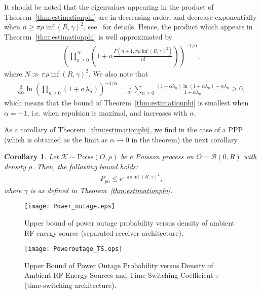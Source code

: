 \documentclass[12pt,draftclsnofoot,onecolumn]{IEEEtran}
\newtheorem{corollary}{Corollary}
\begin{document}
It should be noted that the eigenvalues appearing in the product of Theorem~\ref{thm:estimationphi} are in decreasing order, and decrease exponentially when $n \ge  \pi\rho \inf(R,\gamma)^2$, see~\cite{DecreusefondFlintVergne} for details. Hence, the product which appears in Theorem~\ref{thm:estimationphi} is well approximated by 
\begin{eqnarray}
 \left(\prod_{n\ge 0}^N \left(1+\alpha  \frac{\Gamma(n+1,  \pi\rho\inf(R,\gamma)^2)}{n!}\right)\right)^{-1/\alpha},
\end{eqnarray}
 where $N \gg \pi\rho\inf(R,\gamma)^2$.
We also note that
\begin{eqnarray}
  \frac{\mathrm{d}}{\mathrm{d}\alpha} \ln\left(\prod_{n\ge 0} (1+\alpha \lambda_n)\right)^{-1/\alpha} 
 	=   \frac{1 }{\alpha^2}  \sum_{n\ge 0} \frac{(1+\alpha \lambda_n)\ln(1+\alpha \lambda_n) - \alpha \lambda_n}{1+\alpha \lambda_n} \ge 0,  \nonumber
\end{eqnarray}
which means that the bound of Theorem~\ref{thm:estimationphi} is smallest when $\alpha=-1$, i.e. when repulsion is maximal, and increases with $\alpha$. 

As a corollary of Theorem~\ref{thm:estimationphi}, we find in the case of a PPP (which is obtained as the limit as $\alpha\rightarrow 0$ in the theorem) the next corollary.
\begin{corollary}
Let $\mathcal{K}\sim\mathrm{Poiss}(O,\rho)$ be a Poisson process on $O=\mathcal{B}(0,R)$ with density $\rho$. Then, the following bound holds:
\begin{eqnarray} 
\label{PPP_Poweroutage}
P_{po} \le e^{-\pi\rho\inf(R,\gamma)^2},  
\end{eqnarray}
where $\gamma$ is as defined in Theorem~\ref{thm:estimationphi}.
\end{corollary}

 \begin{figure}
 \centering
  \begin{minipage}[c]{0.48\textwidth}
          \texttt{[image: Power\_outage.eps]}
           \caption{Upper bound of power outage probability versus density of ambient RF energy source (separated receiver architecture).}  \label{fig:power_outage}          
    \end{minipage}
  \begin{minipage}[c]{0.48\textwidth}
          \texttt{[image: Poweroutage\_TS.eps]}
            \caption{Upper Bound of Power Outage Probability versus Density of Ambient RF  Energy Sources and Time-Switching Coefficient $\tau$ (time-switching architecture).}\label{fig:power_outage_TS}        
  \end{minipage}
  \end{figure}
  
\end{document}

